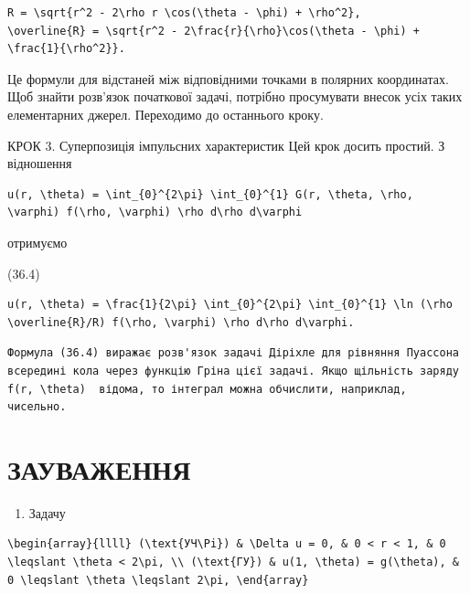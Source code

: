 \documentclass[
  ukrainian,
]{article}
\providecommand{\tightlist}{%
  \setlength{\itemsep}{0pt}\setlength{\parskip}{0pt}}
\begin{document}
\begin{verbatim}
R = \sqrt{r^2 - 2\rho r \cos(\theta - \phi) + \rho^2},
\overline{R} = \sqrt{r^2 - 2\frac{r}{\rho}\cos(\theta - \phi) + \frac{1}{\rho^2}}.
\end{verbatim}

Це формули для відстаней між відповідними точками в полярних
координатах. Щоб знайти розв'язок початкової задачі, потрібно
просумувати внесок усіх таких елементарних джерел. Переходимо до
останнього кроку.

КРОК 3. Суперпозиція імпульсних характеристик Цей крок досить простий. З
відношення

\begin{verbatim}
u(r, \theta) = \int_{0}^{2\pi} \int_{0}^{1} G(r, \theta, \rho, \varphi) f(\rho, \varphi) \rho d\rho d\varphi
\end{verbatim}

отримуємо

(36.4)

\begin{verbatim}
u(r, \theta) = \frac{1}{2\pi} \int_{0}^{2\pi} \int_{0}^{1} \ln (\rho \overline{R}/R) f(\rho, \varphi) \rho d\rho d\varphi.
\end{verbatim}

\begin{verbatim}
Формула (36.4) виражає розв'язок задачі Діріхле для рівняння Пуассона всередині кола через функцію Гріна цієї задачі. Якщо щільність заряду  f(r, \theta)  відома, то інтеграл можна обчислити, наприклад, чисельно.
\end{verbatim}

\section{ЗАУВАЖЕННЯ}\label{ux437ux430ux443ux432ux430ux436ux435ux43dux43dux44f}

\begin{enumerate}
\def\labelenumi{\arabic{enumi}.}
\tightlist
\item
  Задачу
\end{enumerate}

\begin{verbatim}
\begin{array}{llll} (\text{УЧ\Pi}) & \Delta u = 0, & 0 < r < 1, & 0 \leqslant \theta < 2\pi, \\ (\text{ГУ}) & u(1, \theta) = g(\theta), & 0 \leqslant \theta \leqslant 2\pi, \end{array}
\end{verbatim}
\end{document}
